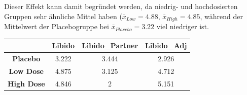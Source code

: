 \documentclass[]{article}
\begin{document}
Dieser Effekt kann damit begründet werden, da niedrig- und hochdosierten
Gruppen sehr ähnliche Mittel haben (\(\bar{x}_{Low} = 4.88\),
\(\bar{x}_{High} = 4.85\), während der Mittelwert der Placebogruppe bei
\(\bar{x}_{Placebo} = 3.22\) viel niedriger ist.

\begin{longtable}[]{@{}cccc@{}}
\toprule
\begin{minipage}[b]{0.20\columnwidth}\centering\strut
~\strut
\end{minipage} & \begin{minipage}[b]{0.11\columnwidth}\centering\strut
Libido\strut
\end{minipage} & \begin{minipage}[b]{0.21\columnwidth}\centering\strut
Libido\_Partner\strut
\end{minipage} & \begin{minipage}[b]{0.15\columnwidth}\centering\strut
Libido\_Adj\strut
\end{minipage}\tabularnewline
\midrule
\endhead
\begin{minipage}[t]{0.20\columnwidth}\centering\strut
\textbf{Placebo}\strut
\end{minipage} & \begin{minipage}[t]{0.11\columnwidth}\centering\strut
3.222\strut
\end{minipage} & \begin{minipage}[t]{0.21\columnwidth}\centering\strut
3.444\strut
\end{minipage} & \begin{minipage}[t]{0.15\columnwidth}\centering\strut
2.926\strut
\end{minipage}\tabularnewline
\begin{minipage}[t]{0.20\columnwidth}\centering\strut
\textbf{Low Dose}\strut
\end{minipage} & \begin{minipage}[t]{0.11\columnwidth}\centering\strut
4.875\strut
\end{minipage} & \begin{minipage}[t]{0.21\columnwidth}\centering\strut
3.125\strut
\end{minipage} & \begin{minipage}[t]{0.15\columnwidth}\centering\strut
4.712\strut
\end{minipage}\tabularnewline
\begin{minipage}[t]{0.20\columnwidth}\centering\strut
\textbf{High Dose}\strut
\end{minipage} & \begin{minipage}[t]{0.11\columnwidth}\centering\strut
4.846\strut
\end{minipage} & \begin{minipage}[t]{0.21\columnwidth}\centering\strut
2\strut
\end{minipage} & \begin{minipage}[t]{0.15\columnwidth}\centering\strut
5.151\strut
\end{minipage}\tabularnewline
\bottomrule
\end{longtable}
\end{document}
